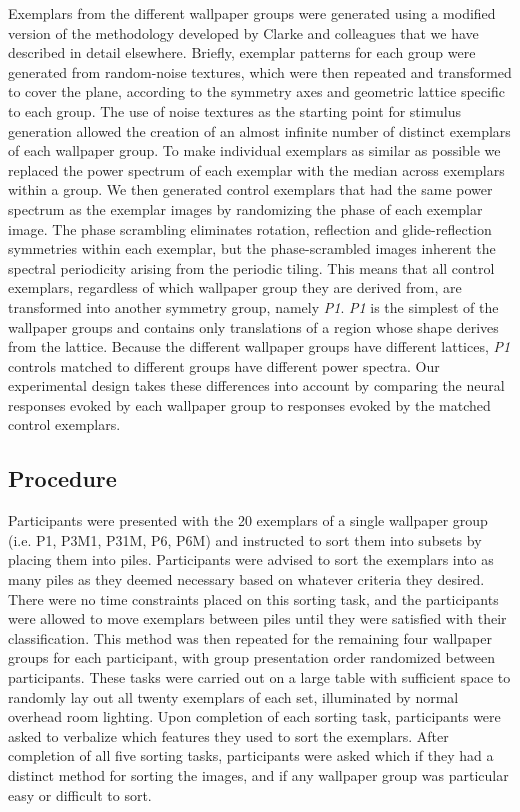 \documentclass[11pt, twoside]{article}
\begin{document}
Exemplars from the different wallpaper groups were generated using a modified version of the methodology developed by Clarke and colleagues\citep{RN172} that we have described in detail elsewhere\citep{RN1725}. Briefly, exemplar patterns for each group were generated from random-noise textures, which were then repeated and transformed to cover the plane, according to the symmetry axes and geometric lattice specific to each group. The use of noise textures as the starting point for stimulus generation allowed the creation of an almost infinite number of distinct exemplars of each wallpaper group. To make individual exemplars as similar as possible we replaced the power spectrum of each exemplar with the median across exemplars within a group. We then generated control exemplars that had the same power spectrum as the exemplar images by randomizing the phase of each exemplar image. The phase scrambling eliminates rotation, reflection and glide-reflection symmetries within each exemplar, but the phase-scrambled images inherent the spectral periodicity arising from the periodic tiling. This means that all control exemplars, regardless of which wallpaper group they are derived from, are transformed into another symmetry group, namely \textit{P1}. \textit{P1} is the simplest of the wallpaper groups and contains only translations of a region whose shape derives from the lattice. Because the different wallpaper groups have different lattices, \textit{P1} controls matched to different groups have different power spectra. Our experimental design takes these differences into account by comparing the neural responses evoked by each wallpaper group to responses evoked by the matched control exemplars.

\subsection*{Procedure}
Participants were presented with the 20 exemplars of a single wallpaper group (i.e. P1, P3M1, P31M, P6, P6M) and instructed to sort them into subsets by placing them into piles. Participants were advised to sort the exemplars into as many piles as they deemed necessary based on whatever criteria they desired. There were no time constraints placed on this sorting task, and the participants were allowed to move exemplars between piles until they were satisfied with their classification. This method was then repeated for the remaining four wallpaper groups for each participant, with group presentation order randomized between participants. These tasks were carried out on a large table with sufficient space to randomly lay out all twenty exemplars of each set, illuminated by normal overhead room lighting. 
Upon completion of each sorting task, participants were asked to verbalize which features they used to sort the exemplars. After completion of all five sorting tasks, participants were asked which if they had a distinct method for sorting the images, and if any wallpaper group was particular easy or difficult to sort.
\end{document}
